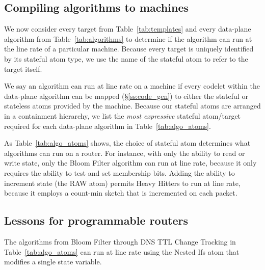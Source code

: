 \subsection{Compiling \pktlanguage algorithms to \absmachine machines}
\label{domino_ss:compiler}
We now consider every target from Table~\ref{tab:templates} and every
data-plane algorithm from Table~\ref{tab:algorithms} to determine if the algorithm
can run at the line rate of a particular \absmachine machine. Because every
target is uniquely identified by its stateful atom type, we use the name of the
stateful atom to refer to the target itself.

We say an algorithm can run at line rate on a \absmachine machine if every
codelet within the data-plane algorithm can be mapped (\S\ref{ss:code_gen}) to
either the stateful or stateless atoms provided by the \absmachine machine.
Because our stateful atoms are arranged in a containment hierarchy, we list the
\textit{most expressive} stateful atom/target required for each data-plane
algorithm in Table~\ref{tab:algo_atoms}.


As Table~\ref{tab:algo_atoms} shows, the choice of stateful atom determines what
algorithms can run on a router. For instance, with only the ability to read or
write state, only the Bloom Filter algorithm can run at line rate, because it
only requires the ability to test and set membership bits.  Adding the ability
to increment state (the RAW atom) permits Heavy Hitters to run at line rate,
because it employs a count-min sketch that is incremented on each packet.

\subsection{Lessons for programmable routers}
\label{ss:lessons}

 The algorithms from Bloom Filter through DNS TTL Change Tracking
in Table~\ref{tab:algo_atoms} can run at line rate using the Nested Ifs atom that
modifies a single state variable.

